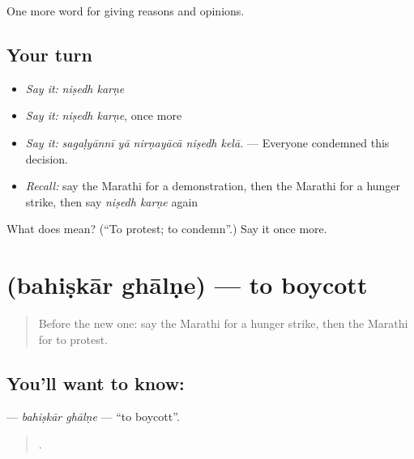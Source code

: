\begin{grammarlens}[title={What you've built}]
One more word for giving reasons and opinions.
\end{grammarlens}

\subsection*{Your turn}
\begin{itemize}
\raggedright
  \item \emph{Say it:} \emph{niṣedh karṇe}
  \item \emph{Say it:} \emph{niṣedh karṇe}, once more
  \item \emph{Say it:} \emph{sagaḷyānnī yā nirṇayācā niṣedh kelā.} — Everyone condemned this decision.
  \item \emph{Recall:} say the Marathi for a demonstration, then the Marathi for a hunger strike, then say \emph{niṣedh karṇe} again
\end{itemize}

\begin{tcolorbox}[breakable,colback=teal!4,colframe=teal!35!black,title={Before you move on}]
What does   mean? (\textquotedblleft{}To protest; to condemn\textquotedblright{}.) Say it once more.
\end{tcolorbox}
\section[\texorpdfstring{\mr{बहिष्कार} \mr{घालणे} (bahiṣkār ghālṇe)}{बहिष्कार घालणे (bahiṣkār ghālṇe)}]{  (bahiṣkār ghālṇe) — to boycott}

\label{lesson:MR-C362-bahiskar-ghalne}



\begin{quote}
Before the new one: say the Marathi for a hunger strike, then the Marathi for to protest.
\end{quote}

\subsection*{You'll want to know:  }
\textbf{ } — \emph{bahiṣkār ghālṇe} — \textquotedblleft{}to boycott\textquotedblright{}.

\begin{quote}
    .
\end{quote}

